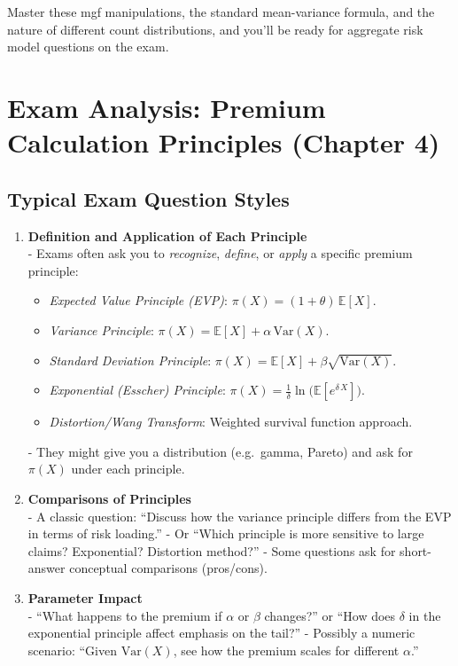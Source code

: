 \documentclass[13pt,a4paper]{article}
\begin{document}
\noindent
Master these mgf manipulations, the standard mean-variance formula, and the nature of different count distributions, and you’ll be ready for aggregate risk model questions on the exam.

\section{Exam Analysis: Premium Calculation Principles (Chapter 4)}
\label{sec:premcalc_exam_analysis}

\subsection{Typical Exam Question Styles}
\begin{enumerate}
  \item \textbf{Definition and Application of Each Principle}\\
    - Exams often ask you to \emph{recognize}, \emph{define}, or \emph{apply} a specific premium principle:
      \begin{itemize}
        \item \emph{Expected Value Principle (EVP)}: \(\pi(X)=(1+\theta)\,\mathbb{E}[X]\).
        \item \emph{Variance Principle}: \(\pi(X) = \mathbb{E}[X] + \alpha\,\mathrm{Var}(X)\).
        \item \emph{Standard Deviation Principle}: \(\pi(X)=\mathbb{E}[X]+\beta\sqrt{\mathrm{Var}(X)}\).
        \item \emph{Exponential (Esscher) Principle}: \(\pi(X)=\frac{1}{\delta}\ln\bigl(\mathbb{E}[e^{\delta\,X}]\bigr)\).
        \item \emph{Distortion/Wang Transform}: Weighted survival function approach.
      \end{itemize}
    - They might give you a distribution (e.g.\ gamma, Pareto) and ask for \(\pi(X)\) under each principle.

  \item \textbf{Comparisons of Principles}\\
    - A classic question: “Discuss how the variance principle differs from the EVP in terms of risk loading.”  
    - Or “Which principle is more sensitive to large claims? Exponential? Distortion method?”  
    - Some questions ask for short-answer conceptual comparisons (pros/cons).

  \item \textbf{Parameter Impact}\\
    - “What happens to the premium if \(\alpha\) or \(\beta\) changes?” or “How does \(\delta\) in the exponential principle affect emphasis on the tail?”  
    - Possibly a numeric scenario: “Given \(\mathrm{Var}(X)\), see how the premium scales for different \(\alpha\).”


\end{enumerate}
\end{document}
